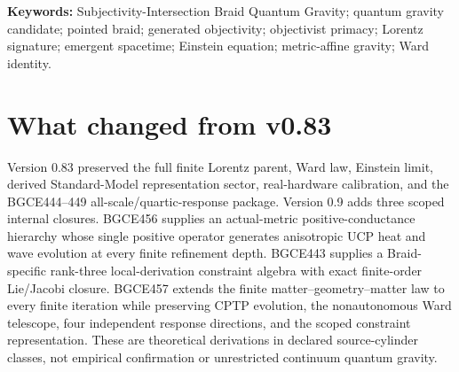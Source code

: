 \documentclass[11pt]{article}
\theoremstyle{definition}
\theoremstyle{remark}
\begin{document}
\noindent\textbf{Keywords:} Subjectivity-Intersection Braid Quantum Gravity; quantum gravity candidate; pointed braid; generated objectivity; objectivist primacy; Lorentz signature; emergent spacetime; Einstein equation; metric-affine gravity; Ward identity.

\section{What changed from v0.83}

Version 0.83 preserved the full finite Lorentz parent, Ward law, Einstein limit, derived Standard-Model representation sector, real-hardware calibration, and the BGCE444--449 all-scale/quartic-response package. Version 0.9 adds three scoped internal closures. BGCE456 supplies an actual-metric positive-conductance hierarchy whose single positive operator generates anisotropic UCP heat and wave evolution at every finite refinement depth. BGCE443 supplies a Braid-specific rank-three local-derivation constraint algebra with exact finite-order Lie/Jacobi closure. BGCE457 extends the finite matter--geometry--matter law to every finite iteration while preserving CPTP evolution, the nonautonomous Ward telescope, four independent response directions, and the scoped constraint representation. These are theoretical derivations in declared source-cylinder classes, not empirical confirmation or unrestricted continuum quantum gravity.
\end{document}
